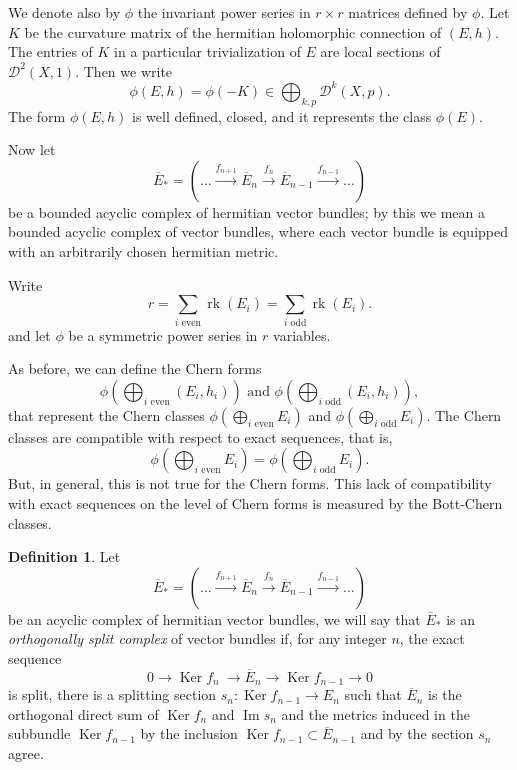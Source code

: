 \documentclass[10pt,twoside]{article}
\numberwithin{equation}{section}
\theoremstyle{plain}
\theoremstyle{definition}
\newtheorem{definition}[equation]{Definition}
\DeclareMathOperator{\Img}{Im}
\DeclareMathOperator{\rk}{rk}
\DeclareMathOperator{\Ker}{Ker}
\begin{document}
We denote also by $\phi $ the invariant power series in $r\times r$
matrices defined by $\phi $. Let $K$ be the curvature matrix of the
hermitian holomorphic connection of $(E,h)$. The entries of $K$ in a
particular trivialization of $E$ are local sections 
of $\mathcal{D}^{2}(X,1)$. Then we write
\begin{displaymath}
  \phi (E,h)=\phi (-K)\in  \bigoplus _{k,p}\mathcal{D}^{k}(X,p).
\end{displaymath}
The form $\phi (E,h)$ is well defined, closed, and it represents the class
$\phi(E)$. 
  
Now let 
\begin{displaymath}
\overline E_{\ast}=(\dots  \overset {f_{n+1}}{\longrightarrow }\overline
    E_{n}\overset {f_{n}}{\longrightarrow }\overline E_{n-1}
\overset {f_{n-1}}{\longrightarrow }\dots )
\end{displaymath}
be a bounded acyclic complex of hermitian vector bundles; by this we
mean 
a bounded acyclic complex of vector bundles, where each vector bundle is
equipped with an arbitrarily chosen hermitian metric. 

Write
\begin{displaymath}
  r=\sum_{i\text{ even}} \rk(E_{i})=\sum_{i\text{ odd}} \rk(E_{i}). 
\end{displaymath}
and let $\phi$ be a
symmetric power series in $r$ variables.

As before, we can define the Chern forms $$\phi
(\bigoplus_{i\text{ even}}(E_{i},h_{i})) \text{ and } 
\phi
(\bigoplus_{i\text{ odd}}(E_{i},h_{i})),$$ that represent the Chern
classes $\phi 
(\bigoplus_{i\text{ even}}E_{i})$ and
$\phi
(\bigoplus_{i\text{ odd}}E_{i})$. 
The Chern classes are compatible with respect to exact sequences, that is,
\begin{displaymath}
\phi
(\bigoplus_{i\text{ even}}E_{i})=\phi 
(\bigoplus_{i\text{ odd}}E_{i}).
\end{displaymath}
But, in general, this is not true for the Chern forms. This lack of
compatibility with exact sequences on the level of Chern forms is
measured by the Bott-Chern 
classes. 

\begin{definition}
  Let 
$$\overline E_{\ast}=(\dots  \overset {f_{n+1}}{\longrightarrow }\overline
    E_{n}\overset {f_{n}}{\longrightarrow }\overline E_{n-1}
\overset {f_{n-1}}{\longrightarrow }\dots )
$$ 
be an acyclic complex of hermitian vector 
bundles, we
will say that $\overline E_{\ast}$ is an \emph{orthogonally 
  split complex} of vector bundles if, for any integer $n$, the exact sequence
\begin{displaymath}
  0 \longrightarrow \Ker f_{n} \
  \longrightarrow \overline E_{n}
  \longrightarrow \Ker f_{n-1} \longrightarrow 0
\end{displaymath}
is split, there is a splitting section $s_{n}\colon\Ker
f_{n-1} \to  E_{n}$ 
such that $\overline E_{n}$ is the orthogonal direct sum of $\Ker
f_{n}$ and $\Img s_{n}$ and the metrics induced in the subbundle
$\Ker f_{n-1} $ by the inclusion $\Ker f_{n-1}\subset \overline E_{n-1}$ and
by the section $s_{n}$ agree. 
\end{definition}
\end{document}
